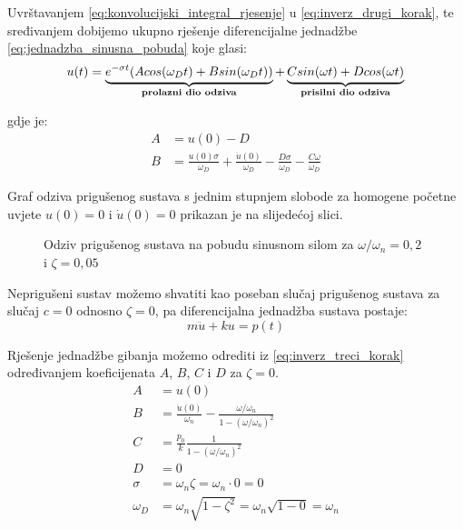 Uvrštavanjem \eqref{eq:konvolucijski_integral_rjesenje} u
\eqref{eq:inverz_drugi_korak}, te sređivanjem dobijemo ukupno rješenje
diferencijalne jednadžbe \eqref{eq:jednadzba_sinusna_pobuda} koje glasi:
\begin{equation}\label{eq:inverz_treci_korak}
	u(t)=\underbrace{
            e^{-\sigma t}(Acos(\omega_D t)+Bsin(\omega_Dt))
		}_{\text{\textbf{prolazni dio odziva}}}
		+
	     \underbrace{
		Csin(\omega t) + Dcos(\omega t)
		     }_{\text{\textbf{prisilni dio odziva}}}
\end{equation}

gdje je:
\begin{align}
    A &= u(0)-D\label{eq:koef_A}\\
    B &= \frac{u(0)\sigma}{\omega_D}+
         \frac{\dot{u}(0)}{\omega_D}-
         \frac{D\sigma}{\omega_D}-
         \frac{C\omega}{\omega_D}\label{eq:koef_B}
\end{align}

Graf odziva prigušenog sustava s jednim stupnjem slobode za homogene početne
uvjete $u(0)=0$ i $\dot{u}(0)=0$ prikazan je na slijedećoj slici.
\begin{figure}[H]
    
    \label{fig:odziv-priguseno}
    \caption{Odziv prigušenog sustava na pobudu sinusnom silom za
    $\omega/\omega_n=0,2$ i $\zeta=0,05$}
\end{figure}
\newpage

Neprigušeni sustav možemo shvatiti kao poseban slučaj prigušenog sustava za slučaj
$c=0$ odnosno $\zeta=0$, pa diferencijalna jednadžba sustava postaje:
\begin{equation}\label{eq:jednadzba_gibanja_nepriguseni_nesredjeno}
	m\ddot{u}+ku=p(t)
\end{equation}

Rješenje jednadžbe gibanja možemo odrediti iz \eqref{eq:inverz_treci_korak}
određivanjem koeficijenata $A$, $B$, $C$ i $D$ za $\zeta = 0$.
\begin{align}
    A &= u(0) \label{eq:np_koef_A}\\
    B &= \frac{\dot{u}(0)}{\omega_n}-\frac{\omega/\omega_n}{1-(\omega/\omega_n)^2}\label{eq:np_koef_B}\\
    C &= \frac{p_0}{k}\frac{1}{1-(\omega/\omega_n)^2}\label{eq:np_koef_C}\\
    D &= 0\label{eq:np_koef_D}\\
    \sigma &= \omega_n\zeta=\omega_n\cdot 0=0\label{eq:np_sigma}\\
    \omega_D &= \omega_n\sqrt{1-\zeta^2}=\omega_n\sqrt{1-0}=\omega_n\label{eq:np_omega_D}
\end{align}


